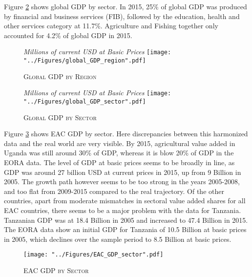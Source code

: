 \documentclass[a4paper]{article}
\begin{document}
Figure \ref{fig:wld_GDP_sec} shows global GDP by sector. In 2015, 25\% of global GDP was produced by financial and business services (FIB), followed by the education, health and other services category at 11.7\%. Agriculture and Fishing together only accounted for 4.2\% of global GDP in 2015.




\begin{figure}[h!]
\centering
\caption{\label{fig:wld_GDP_reg}\textsc{Global GDP by Region}}
\small{\textit{Millions of current USD at Basic Prices}}
\texttt{[image: "../Figures/global\_GDP\_region".pdf]} %
\end{figure}
\FloatBarrier

\begin{figure}[h!]
\centering
\caption{\label{fig:wld_GDP_sec}\textsc{Global GDP by Sector}}
\small{\textit{Millions of current USD at Basic Prices}}
\texttt{[image: "../Figures/global\_GDP\_sector".pdf]} %
\end{figure}
\FloatBarrier

Figure \ref{fig:EAC_GDP_sec} shows EAC GDP by sector. Here discrepancies between this harmonized data and the real world are very visible. By 2015, agricultural value added in Uganda was still around 30\% of GDP, whereas it is blow 20\% of GDP in the EORA data. The level of GDP at basic prices seems to be broadly in line, as GDP was around 27 billion USD at current prices in 2015, up from 9 Billion in 2005. The growth path however seems to be too strong in the years 2005-2008, and too flat from 2009-2015 compared to the real trajectory. Of the other countries, apart from moderate mismatches in sectoral value added shares for all EAC countries, there seems to be a major problem with the data for Tanzania. Tanzanian GDP was at 18.4 Billion in 2005 and increased to 47.4 Billion in 2015. The EORA data show an initial GDP for Tanzania of 10.5 Billion at basic prices in 2005, which declines over the sample period to 8.5 Billion at basic prices. \newline



\begin{figure}[h!]
\centering
\caption{\label{fig:EAC_GDP_sec}\textsc{EAC GDP by Sector}}
\texttt{[image: "../Figures/EAC\_GDP\_sector".pdf]} %
\end{figure}
\FloatBarrier
\end{document}

